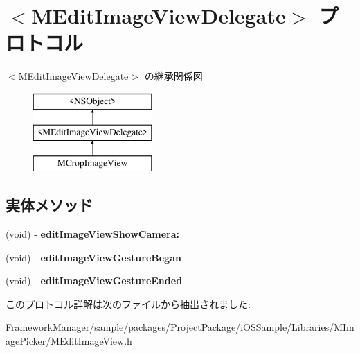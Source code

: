 \hypertarget{protocol_m_edit_image_view_delegate-p}{}\section{$<$M\+Edit\+Image\+View\+Delegate$>$ プロトコル}
\label{protocol_m_edit_image_view_delegate-p}
$<$M\+Edit\+Image\+View\+Delegate$>$ の継承関係図\begin{figure}[H]
\begin{center}
\leavevmode
\includegraphics[height=3.000000cm]{protocol_m_edit_image_view_delegate-p}
\end{center}
\end{figure}
\subsection*{実体メソッド}
\begin{DoxyCompactItemize}
\item 
\hypertarget{protocol_m_edit_image_view_delegate-p_a2f2038e9d00f5149c1127ccb1de974e2}{}(void) -\/ {\bfseries edit\+Image\+View\+Show\+Camera\+:}\label{protocol_m_edit_image_view_delegate-p_a2f2038e9d00f5149c1127ccb1de974e2}

\item 
\hypertarget{protocol_m_edit_image_view_delegate-p_a39bafe392dce67b6c9cdf77dee35e335}{}(void) -\/ {\bfseries edit\+Image\+View\+Gesture\+Began}\label{protocol_m_edit_image_view_delegate-p_a39bafe392dce67b6c9cdf77dee35e335}

\item 
\hypertarget{protocol_m_edit_image_view_delegate-p_a13ad77d052a51a15a729c29c4984217e}{}(void) -\/ {\bfseries edit\+Image\+View\+Gesture\+Ended}\label{protocol_m_edit_image_view_delegate-p_a13ad77d052a51a15a729c29c4984217e}

\end{DoxyCompactItemize}


このプロトコル詳解は次のファイルから抽出されました\+:\begin{DoxyCompactItemize}
\item 
Framework\+Manager/sample/packages/\+Project\+Package/i\+O\+S\+Sample/\+Libraries/\+M\+Image\+Picker/M\+Edit\+Image\+View.\+h\end{DoxyCompactItemize}
